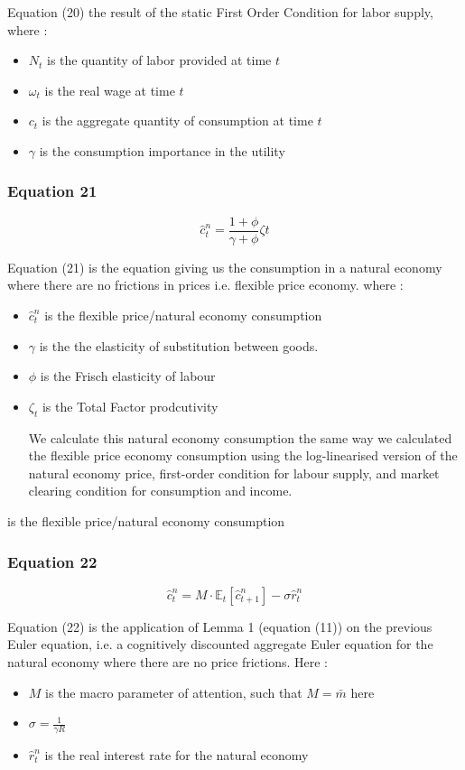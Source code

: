 \documentclass{article}
\begin{document}
Equation (20) the result of the static First Order Condition for labor supply, where : 
\begin{itemize}
    \item $N_{t}$ is the quantity of labor provided at time $t$
    \item $\omega_{t}$ is the real wage at time $t$
    \item $c_{t}$ is the aggregate quantity of consumption at time $t$
    \item $\gamma$ is the consumption importance in the utility
\end{itemize}

\subsubsection*{Equation 21}
\begin{equation}
    \hat{c}_{t}^{n}=\frac{1+\phi}{\gamma+\phi}\zeta{t}
\end{equation}

Equation (21) is the equation giving us the consumption in a natural economy where there are no frictions in prices i.e. flexible price economy. where :
\begin{itemize}
    \item $\hat{c}_{t}^{n}$ is the flexible price/natural economy consumption 
    \item $\gamma$ is the the elasticity of substitution between goods. 
    \item $\phi$ is the Frisch elasticity of labour
    \item $\zeta_{t}$ is the Total Factor prodcutivity

We calculate this natural economy consumption the same way we calculated the flexible price economy consumption using the log-linearised version of the natural economy price, first-order condition for labour supply, and market clearing condition for consumption and income. 
\end{itemize} is the flexible price/natural economy consumption

\subsubsection*{Equation 22}
\begin{equation}
    \hat{c}^{n}_{t} = M\cdot\mathbb{E}_{t}\left[\hat{c}^{n}_{t+1}\right]-\sigma\hat{r}^{n}_{t}
\end{equation}

Equation (22) is the application of Lemma 1 (equation (11)) on the previous Euler equation, i.e. a cognitively discounted aggregate Euler equation for the natural economy where there are no price frictions. Here : 
\begin{itemize}
    \item $M$ is the macro parameter of attention, such that $M=\bar{m}$ here
    \item $\sigma=\frac{1}{\gamma R}$ 
    \item $\hat r_{t}^{n}$ is the real interest rate for the natural economy
\end{itemize}
\end{document}
